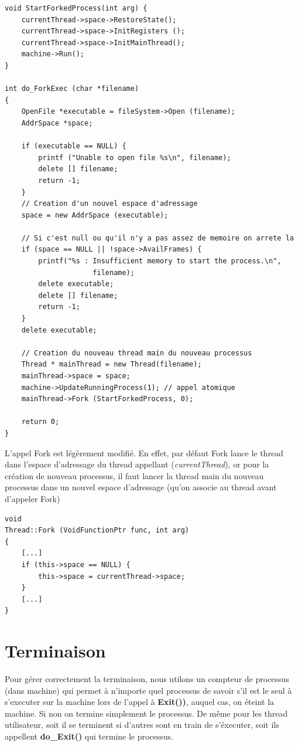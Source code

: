 \documentclass[a4paper,10pt]{article}
\begin{document}
\begin{lstlisting}
void StartForkedProcess(int arg) {
    currentThread->space->RestoreState();
    currentThread->space->InitRegisters ();
    currentThread->space->InitMainThread();
    machine->Run();
}

int do_ForkExec (char *filename)
{
    OpenFile *executable = fileSystem->Open (filename);
    AddrSpace *space;

    if (executable == NULL) {
        printf ("Unable to open file %s\n", filename);
        delete [] filename;
        return -1;
    }
    // Creation d'un nouvel espace d'adressage
    space = new AddrSpace (executable);

    // Si c'est null ou qu'il n'y a pas assez de memoire on arrete la
    if (space == NULL || !space->AvailFrames) {
        printf("%s : Insufficient memory to start the process.\n",
                     filename);
        delete executable;
        delete [] filename;
        return -1;
    }
    delete executable;

    // Creation du nouveau thread main du nouveau processus
    Thread * mainThread = new Thread(filename);
    mainThread->space = space;
    machine->UpdateRunningProcess(1); // appel atomique
    mainThread->Fork (StartForkedProcess, 0);

    return 0;
}
\end{lstlisting}

L'appel Fork est légèrement modifié. En effet, par défaut Fork lance le thread
dans l'espace d'adressage du thread appellant (\textit{currentThread}), or pour
la création de nouveau processus, il faut lancer la thread main du nouveau
processus dans un nouvel espace d'adressage (qu'on associe au thread avant
d'appeler Fork)

\begin{lstlisting}
void
Thread::Fork (VoidFunctionPtr func, int arg)
{
    [...]
    if (this->space == NULL) {
        this->space = currentThread->space;
    }
    [...]
}
\end{lstlisting}

\section{Terminaison}

Pour gérer correctement la terminaison, nous utilons un compteur de processus
(dans machine) qui permet à n'importe quel processus de savoir s'il est le
seul à s'executer sur la machine lors de l'appel à \textbf{Exit())}, auquel cas,
on éteint la machine. Si non on termine simplement le processus. De même pour
les thread utilisateur, soit il se terminent si d'autres sont en train de
s'éxecuter, soit ils appellent \textbf{do\_Exit()} qui termine le processus.
\end{document}
